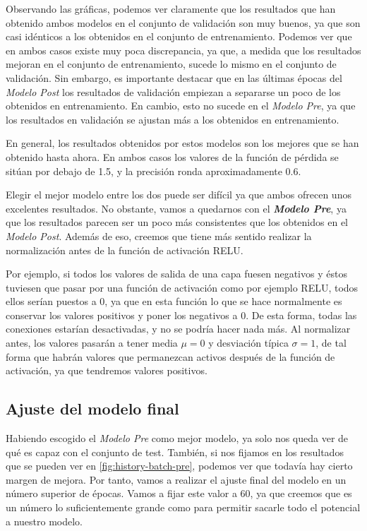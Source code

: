\documentclass[11pt,a4paper]{article}
\begin{document}
Observando las gráficas, podemos ver claramente que los resultados que han obtenido ambos
modelos en el conjunto de validación son muy buenos, ya que son casi idénticos a los obtenidos
en el conjunto de entrenamiento. Podemos ver que en ambos casos existe muy poca discrepancia,
ya que, a medida que los resultados mejoran en el conjunto de entrenamiento, sucede lo mismo
en el conjunto de validación. Sin embargo, es importante destacar que en las últimas épocas
del \textit{Modelo Post} los resultados de validación empiezan a separarse un poco de los
obtenidos en entrenamiento. En cambio, esto no sucede en el \textit{Modelo Pre}, ya que los
resultados en validación se ajustan más a los obtenidos en entrenamiento.

En general, los resultados obtenidos por estos modelos son los mejores que se han obtenido
hasta ahora. En ambos casos los valores de la función de pérdida se sitúan por debajo de 1.5,
y la precisión ronda aproximadamente 0.6.

Elegir el mejor modelo entre los dos puede ser difícil ya que ambos ofrecen unos excelentes
resultados. No obstante, vamos a quedarnos con el \textbf{\textit{Modelo Pre}}, ya que los resultados
parecen ser un poco más consistentes que los obtenidos en el \textit{Modelo Post}. Además de eso,
creemos que tiene más sentido realizar la normalización antes de la función de activación RELU.

Por ejemplo, si todos los valores de salida de una capa fuesen negativos y éstos tuviesen que pasar
por una función de activación como por ejemplo RELU, todos ellos serían puestos a 0, ya que en esta
función lo que se hace normalmente es conservar los valores positivos y poner los negativos a 0.
De esta forma, todas las conexiones estarían desactivadas, y no se podría hacer nada más. Al normalizar
antes, los valores pasarán a tener media $\mu = 0$ y desviación típica $\sigma = 1$, de tal forma
que habrán valores que permanezcan activos después de la función de activación, ya que tendremos
valores positivos.


\subsection{Ajuste del modelo final}

Habiendo escogido el \textit{Modelo Pre} como mejor modelo, ya solo nos queda ver de qué es capaz
con el conjunto de test. También, si nos fijamos en los resultados que se pueden ver en
\ref{fig:history-batch-pre}, podemos ver que todavía hay cierto margen de mejora. Por tanto,
vamos a realizar el ajuste final del modelo en un número superior de épocas. Vamos a fijar
este valor a 60, ya que creemos que es un número lo suficientemente grande como para permitir
sacarle todo el potencial a nuestro modelo.
\end{document}

